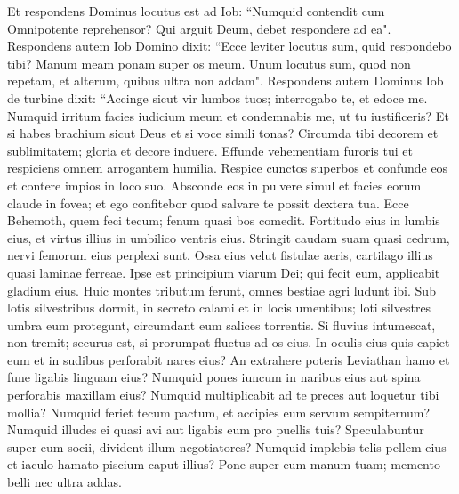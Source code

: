 \begin{biblechapter}  
\verse Et respondens Dominus locutus est ad Iob: 
\verse “Numquid contendit cum Omnipotente reprehensor? Qui arguit Deum, debet respondere ad ea". 
\verse Respondens autem Iob Domino dixit: 
\verse “Ecce leviter locutus sum, quid respondebo tibi? Manum meam ponam super os meum. 
\verse Unum locutus sum, quod non repetam, et alterum, quibus ultra non addam". 
\verse Respondens autem Dominus Iob de turbine dixit: 
\verse “Accinge sicut vir lumbos tuos; interrogabo te, et edoce me. 
\verse Numquid irritum facies iudicium meum et condemnabis me, ut tu iustificeris? 
\verse Et si habes brachium sicut Deus et si voce simili tonas? 
\verse Circumda tibi decorem et sublimitatem; gloria et decore induere. 
\verse Effunde vehementiam furoris tui et respiciens omnem arrogantem humilia. 
\verse Respice cunctos superbos et confunde eos et contere impios in loco suo. 
\verse Absconde eos in pulvere simul et facies eorum claude in fovea; 
\verse et ego confitebor quod salvare te possit dextera tua. 
\verse Ecce Behemoth, quem feci tecum; fenum quasi bos comedit. 
\verse Fortitudo eius in lumbis eius, et virtus illius in umbilico ventris eius. 
\verse Stringit caudam suam quasi cedrum, nervi femorum eius perplexi sunt. 
\verse Ossa eius velut fistulae aeris, cartilago illius quasi laminae ferreae. 
\verse Ipse est principium viarum Dei; qui fecit eum, applicabit gladium eius. 
\verse Huic montes tributum ferunt, omnes bestiae agri ludunt ibi. 
\verse Sub lotis silvestribus dormit, in secreto calami et in locis umentibus; 
\verse loti silvestres umbra eum protegunt, circumdant eum salices torrentis. 
\verse Si fluvius intumescat, non tremit; securus est, si prorumpat fluctus ad os eius. 
\verse In oculis eius quis capiet eum et in sudibus perforabit nares eius? 
\verse An extrahere poteris Leviathan hamo et fune ligabis linguam eius? 
\verse Numquid pones iuncum in naribus eius aut spina perforabis maxillam eius? 
\verse Numquid multiplicabit ad te preces aut loquetur tibi mollia? 
\verse Numquid feriet tecum pactum, et accipies eum servum sempiternum? 
\verse Numquid illudes ei quasi avi aut ligabis eum pro puellis tuis? 
\verse Speculabuntur super eum socii, divident illum negotiatores? 
\verse Numquid implebis telis pellem eius et iaculo hamato piscium caput illius? 
\verse Pone super eum manum tuam; memento belli nec ultra addas. 
\end{biblechapter}

